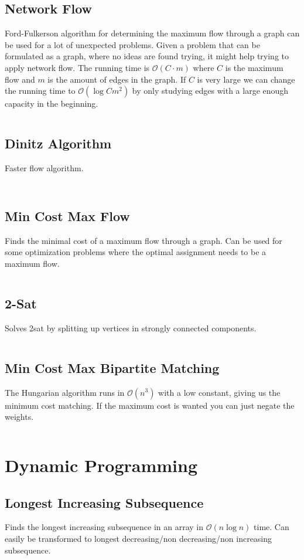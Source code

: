 \documentclass[8pt,a4paper,landscape,oneside]{amsart}
\newcommand{\codej}[1]{\inputminted[fontsize=\large,tabsize=2,baselinestretch=1]{java}{code/#1}}
\newcommand{\codec}[1]{\inputminted[fontsize=\large,tabsize=2,baselinestretch=1]{cpp}{code/#1}}
\newcommand{\codep}[1]{\inputminted[fontsize=\large,tabsize=2,baselinestretch=1]{py}{code/#1}}
\newcommand{\bigO}{\mathcal{O}}
\begin{document}
\begin{multicols*}{2}
\begin{large}
    \subsection{Network Flow}
        Ford-Fulkerson algorithm for determining the maximum flow through a graph can be used for a lot of unexpected problems. Given a problem that can be formulated as a graph, where no ideas are found trying, it might help trying to apply network flow. The running time is $\bigO (C \cdot m)$ where $C$ is the maximum flow and $m$ is the amount of edges in the graph. 
        If $C$ is very large we can change the running time to $\bigO (\log{C}m^2)$ by only studying edges with a large enough capacity in the beginning.
        \codep{Graphs/flow.py}
    \subsection{Dinitz Algorithm}
    Faster flow algorithm.
        \codep{Graphs/dinitz.py}
        \codec{Graphs/dinic.cpp}
    \subsection{Min Cost Max Flow}
        Finds the minimal cost of a maximum flow through a graph. 
        Can be used for some optimization problems where the optimal assignment needs to be a maximum flow.
        \codej{Graphs/MinCostMaxFlow.java}
    \subsection{2-Sat}
        Solves 2sat by splitting up vertices in strongly connected components.
        \codej{Graphs/TwoSat.py}
    \subsection{Min Cost Max Bipartite Matching}
        The Hungarian algorithm runs in $\bigO(n^3)$ with a low constant, giving us the minimum cost matching. If the maximum cost is wanted you can just negate the weights.
        \codec{Graphs/Hungarian.cpp}

\section{Dynamic Programming}
    \subsection{Longest Increasing Subsequence}
        Finds the longest increasing subsequence in an array in $\bigO(n \log{n})$ time. Can easily be transformed to longest decreasing/non decreasing/non increasing subsequence.
        \codej{DP/lis.py}

\end{large}
\end{multicols*}
\end{document}
